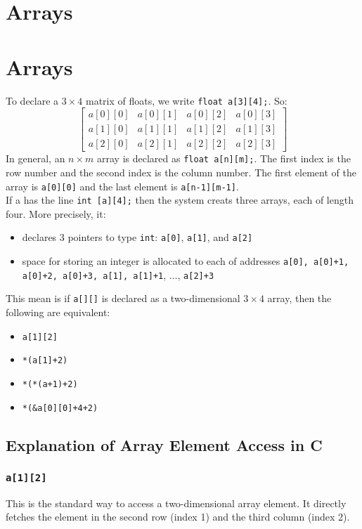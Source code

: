 \documentclass[a4paper, 10pt]{article}
\begin{document}
\section{Arrays}
\section{Arrays}
To declare a $3 \times 4$ matrix of floats, we write \texttt{float a[3][4];}. So:
$$\begin{bmatrix}
        a[0][0] & a[0][1] & a[0][2] & a[0][3] \\
        a[1][0] & a[1][1] & a[1][2] & a[1][3] \\
        a[2][0] & a[2][1] & a[2][2] & a[2][3]
    \end{bmatrix}
$$
In general, an $n \times m$ array is declared as \texttt{float a[n][m];}. The first index is the row number and the second index is the column number. The first element of the array is \texttt{a[0][0]} and the last element is \texttt{a[n-1][m-1]}. \\[2ex]
If a has the line \texttt{int [a][4];} then the system creats three arrays, each of length four. More precisely, it:
\begin{itemize}
    \item declares 3 pointers to type \texttt{int}: \texttt{a[0]}, \texttt{a[1]}, and \texttt{a[2]}
    \item space for storing an integer is allocated to each of addresses \texttt{a[0], a[0]+1, a[0]+2, a[0]+3, a[1], a[1]+1}, $\dots$, \texttt{a[2]+3}
\end{itemize}
This mean is if \texttt{a[][]} is declared as a two-dimensional $3 \times 4$ array, then the following are equivalent:
\begin{itemize}
    \item \texttt{a[1][2]}
    \item \texttt{*(a[1]+2)}
    \item \texttt{*(*(a+1)+2)}
    \item \texttt{*(\&a[0][0]+4+2)}
\end{itemize}
\pagebreak
\subsection{Explanation of Array Element Access in C}

\subsubsection*{\texttt{a[1][2]}}
This is the standard way to access a two-dimensional array element. It directly fetches the element in the second row (index 1) and the third column (index 2).
\end{document}

